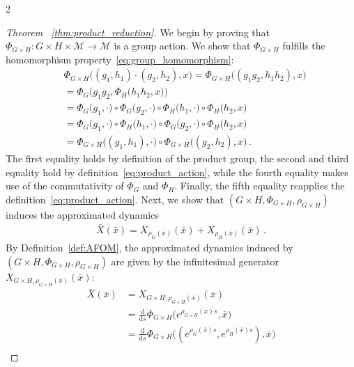 \documentclass{article}
\newtheorem{proof}{Proof}[theorem]
\newcommand{\M}{\mathcal{M}}                                %
\newcommand{\appX}{\bar{X}}
\newcommand{\appstate}{\bar{x}}
\newcommand{\ext}{\text{d}}                                 %
\begin{document}
\begin{multicols}{2}
\begin{proof}[Theorem ~\ref{thm:product_reduction}]
    We begin by proving that $\Phi_{G\times H}: G\times H \times \M \rightarrow \M$ is a group action.
    We show that $\Phi_{G\times H}$ fulfills the homomorphism property~\eqref{eq:group_homomorphism}:
    \begin{align*}
         & \Phi_{G\times H}\big((g_1,h_1)\cdot(g_2,h_2), x\big)  = \Phi_{G\times H}\big((g_1 g_2,h_1h_2), x\big) \\
        & = \Phi_{G}\big(g_1g_2, \Phi_H\big(h_1h_2, x \big) \big) \\
        & = \Phi_{G}\big(g_1, \cdot\big)\circ \Phi_{G}\big(g_2, \cdot\big) \circ \Phi_{H}\big(h_1, \cdot\big) \circ \Phi_H\big(h_2, x \big) \\ 
        & = \Phi_{G}\big(g_1, \cdot\big) \circ \Phi_{H}\big(h_1, \cdot\big) \circ \Phi_{G}\big(g_2, \cdot\big) \circ \Phi_H\big(h_2, x \big) \\ 
        & = \Phi_{G\times H}\big((g_1,h_1),\cdot) \circ \Phi_{G\times H}\big((g_2,h_2),x\big)\,.
    \end{align*}
    The first equality holds by definition of the product group, the second and third equality hold by definition~\eqref{eq:product_action}, while the fourth equality makes use of the commutativity of $\Phi_G$ and $\Phi_H$. Finally, the fifth equality reapplies the definition~\eqref{eq:product_action}.
    Next, we show that $(G\times H, \Phi_{G\times H}, \rho_{G\times H})$ induces the approximated dynamics 
    \begin{align}
        \appX(\appstate) %
        = X_{\rho_G(\appstate)}(\appstate) + X_{\rho_H(\appstate)}(\appstate) \,.
    \end{align}
    By Definition~\ref{def:AFOM}, the approximated dynamics induced by $(G\times H, \Phi_{G\times H}, \rho_{G\times H})$ are given by the infinitesimal generator $X_{G\times H, \rho_{G\times H}(\appstate)}(\appstate)$:
    \begin{align*}
        \appX(\appstate) &= X_{G\times H, \rho_{G\times H}(\appstate)}(\appstate) \\ 
        &= \frac{\ext}{\ext s} \Phi_{G\times H}\big(e^{\rho_{G\times H}(\appstate)s},\appstate\big) \\
        &= \frac{\ext}{\ext s} \Phi_{G\times H}\big((e^{\rho_{G}(\appstate)s}, e^{\rho_{H}(\appstate)s}),\appstate\big) \\ 

\end{align*}
\end{proof}
\end{multicols}
\end{document}
